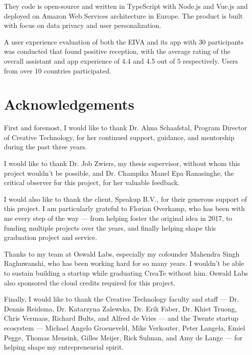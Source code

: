 \documentclass{article}
\begin{document}
They code is open-source and written in TypeScript with Node.js and Vue.js and deployed on Amazon Web Services architecture in Europe. The product is built with focus on data privacy and user personalization.

A user experience evaluation of both the EIVA and its app with 30 participants was conducted that found positive reception, with the average rating of the overall assistant and app experience of 4.4 and 4.5 out of 5 respectively. Users from over 10 countries participated.

\newpage

\section*{Acknowledgements}

First and foremost, I would like to thank Dr. Alma Schaafstal, Program Director of Creative Technology, for her continued support, guidance, and mentorship during the past three years.

I would like to thank Dr. Job Zwiers, my thesis supervisor, without whom this project wouldn't be possible, and Dr. Champika Manel Epa Ranasinghe, the critical observer for this project, for her valuable feedback.

I would also like to thank the client, Speakup B.V., for their generous support of this project. I am particularly grateful to Florian Overkamp, who has been with me every step of the way --- from helping foster the original idea in 2017, to funding multiple projects over the years, and finally helping shape this graduation project and service.

Thanks to my team at Oswald Labs, especially my cofounder Mahendra Singh Raghuwanshi, who has been working hard for so many years. I wouldn't be able to sustain building a startup while graduating CreaTe without him. Oswald Labs also sponsored the cloud credits required for this project.

Finally, I would like to thank the Creative Technology faculty and staff --- Dr. Dennis Reidsma, Dr. Katarzyna Zalewska, Dr. Erik Faber, Dr. Khiet Truong, Chris Vermaas, Richard Bults, and Alfred de Vries --- and the Twente startup ecosystem --- Michael Angelo Groeneveld, Mike Verkouter, Peter Langela, Emiel Pegge, Thomas Mensink, Gilles Meijer, Rick Sulman, and Amy de Lange --- for helping shape my entrepreneurial spirit.

\newpage

\tableofcontents
\end{document}
